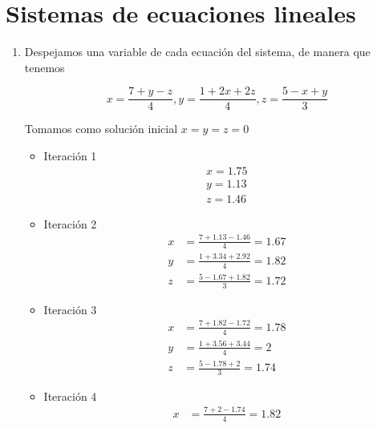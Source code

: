 \documentclass[12pt, letterpaper]{article}
\begin{document}
\section{Sistemas de ecuaciones lineales}
\begin{enumerate}
    \item Despejamos una variable de cada ecuación del sistema, de manera que tenemos
    
    \begin{equation*}
        x = \frac{7+y-z}{4}, y = \frac{1+2x+2z}{4}, z = \frac{5-x+y}{3}
    \end{equation*}
    
    Tomamos como solución inicial $x=y=z=0$
    \begin{itemize}
        \item Iteración 1
        \begin{equation*}
            \begin{aligned}
                x = 1.75 \\
                y = 1.13 \\
                z = 1.46
            \end{aligned}
        \end{equation*}
        \item Iteración 2
        \begin{equation*}
            \begin{aligned}
                x & = \frac{7+1.13-1.46}{4} = 1.67 \\
                y & = \frac{1+3.34+2.92}{4} = 1.82 \\
                z & = \frac{5-1.67+1.82}{3} = 1.72
            \end{aligned}
        \end{equation*}
        \item Iteración 3
        \begin{equation*}
            \begin{aligned}
                x & = \frac{7+1.82-1.72}{4} = 1.78 \\
                y & = \frac{1+3.56+3.44}{4} = 2 \\
                z & = \frac{5-1.78+2}{3} = 1.74
            \end{aligned}
        \end{equation*}
        \item Iteración 4
        \begin{equation*}
            \begin{aligned}
                x & = \frac{7+2-1.74}{4} = 1.82 \\

\end{aligned}
\end{equation*}
\end{itemize}
\end{enumerate}
\end{document}
